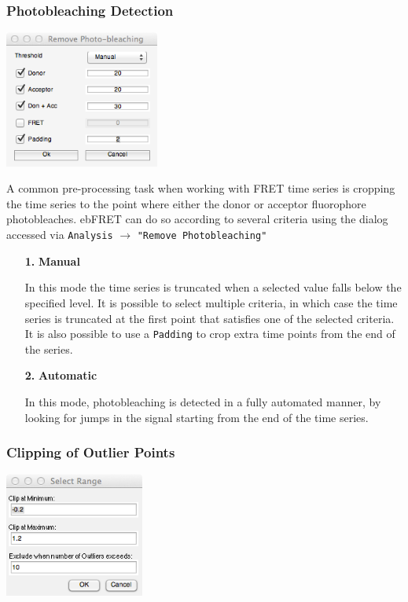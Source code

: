 \documentclass[12pt,article,oldfontcommands]{memoir}
\newcommand{\indt}{\qquad}
\begin{document}
\subsubsection{Photobleaching Detection}

\indt\includegraphics[width=2in]{images/remove_photobleaching_dialog}

A common pre-processing task when working with FRET time series is cropping the time series to the point where either the donor or acceptor fluorophore photobleaches. ebFRET can do so according to several criteria using the dialog accessed via \texttt{Analysis} $\to$ \texttt{"Remove Photobleaching"} 

\begin{itemize}
\item[\textbf{1.}] \textbf{Manual}

In this mode the time series is truncated when a selected value falls below the specified level. It is possible to select multiple criteria, in which case the time series is truncated at the first point that satisfies one of the selected criteria. It is also possible to use a \texttt{Padding} to crop extra time points from the end of the series.

\item[\textbf{2.}] \textbf{Automatic}

In this mode, photobleaching is detected in a fully automated manner, by looking for jumps in the signal starting from the end of the time series. 
\end{itemize}

\subsubsection{Clipping of Outlier Points}

\indt\includegraphics[width=1.8in]{images/clip_outliers_dialog}
\end{document}
